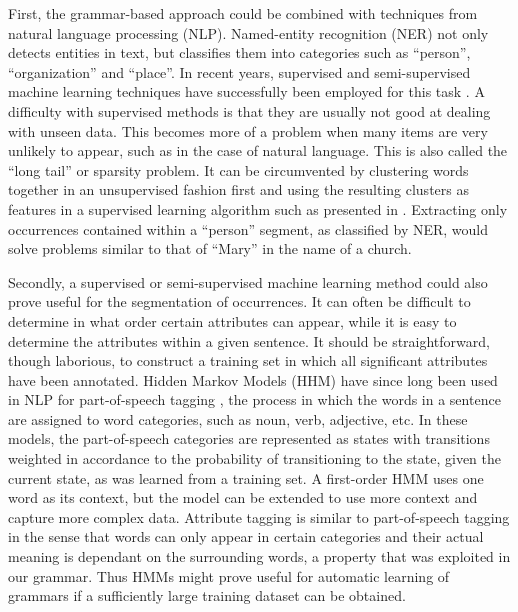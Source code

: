 First, the grammar-based approach could be combined with techniques from natural language processing (NLP).
Named-entity recognition (NER) not only detects entities in text, but classifies them into categories such as ``person'', ``organization'' and ``place''.
In recent years, supervised and semi-supervised machine learning techniques have successfully been employed for this task \citep{Miller2004}.
A difficulty with supervised methods is that they are usually not good at dealing with unseen data.
This becomes more of a problem when many items are very unlikely to appear, such as in the case of natural language.
This is also called the ``long tail'' or sparsity problem.
It can be circumvented by clustering words together in an unsupervised fashion first and using the resulting clusters as features in a supervised learning algorithm such as presented in \citet{Miller2004}.
Extracting only occurrences contained within a ``person'' segment, as classified by NER, would solve problems similar to that of ``Mary'' in the name of a church.

Secondly, a supervised or semi-supervised machine learning method could also prove useful for the segmentation of occurrences.
It can often be difficult to determine in what order certain attributes can appear, while it is easy to determine the attributes within a given sentence.
It should be straightforward, though laborious, to construct a training set in which all significant attributes have been annotated.
Hidden Markov Models (HHM) have since long been used in NLP for part-of-speech tagging \citep{Kupiec1992}, the process in which the words in a sentence are assigned to word categories, such as noun, verb, adjective, etc.
In these models, the part-of-speech categories are represented as states with transitions weighted in accordance to the probability of transitioning to the state, given the current state, as was learned from a training set.
A first-order HMM uses one word as its context, but the model can be extended to use more context and capture more complex data.
Attribute tagging is similar to part-of-speech tagging in the sense that words can only appear in certain categories and their actual meaning is dependant on the surrounding words, a property that was exploited in our grammar.
Thus HMMs might prove useful for automatic learning of grammars if a sufficiently large training dataset can be obtained.

